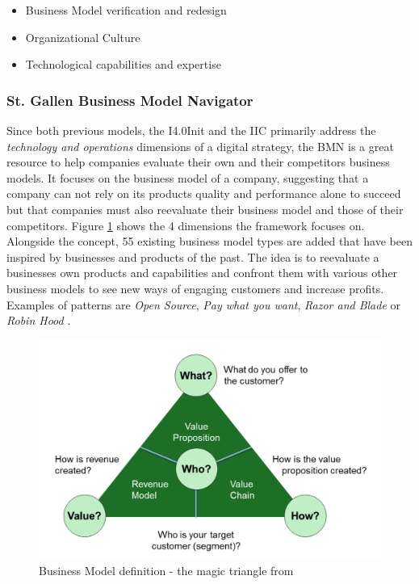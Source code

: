 \begin{itemize}
	\item Business Model verification and redesign \cite{gassmann:gallen:2013geschaeftsmodelle}
	\item Organizational Culture
	\item Technological capabilities and expertise
\end{itemize}

\subsubsection{St. Gallen Business Model Navigator}

Since both previous models, the  \ac{I4.0Init} and  the \ac{IIC} primarily address the \emph{technology and operations} dimensions of a digital strategy, the \ac{BMN} is a great resource to help companies evaluate their own and their competitors business models. It focuses on the business model of a company, suggesting that a company can not rely on its products quality and performance alone to succeed but that companies must also reevaluate their business model and those of their competitors. Figure \ref{fig:BMN} shows the 4 dimensions the framework focuses on. Alongside the concept, 55 existing business model types are added that have been inspired by businesses and products of the past. The idea is to reevaluate a businesses own products and capabilities and confront them with various other business models to see new ways of engaging customers and increase profits. Examples of patterns are \emph{Open Source}, \emph{Pay what you want}, \emph{Razor and Blade} or \emph{Robin Hood} \cite{gassmann:gallen:2013geschaeftsmodelle}.

\begin{figure}[H]
\centering
\includegraphics[width=1\columnwidth]{images/BMN}
\caption{Business Model definition - the magic triangle from \citeauthor{gassmann:gallen:2013geschaeftsmodelle}}
\label{fig:BMN}
\end{figure}


